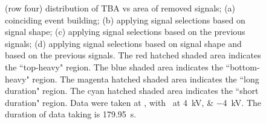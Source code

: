 \begin{landscape}
\begin{figure}[!p]
{			(row four) distribution of TBA vs area of removed signals;
			(a) coinciding event building; 
			(b) applying signal selections based on signal shape;
			(c) applying signal selections based on the previous signals;
			(d) applying signal selections based on signal shape and based on the previous signals.
			The red hatched shaded area indicates the ``top-heavy" region.
			The blue shaded area indicates the ``bottom-heavy" region.
			The magenta hatched shaded area indicates the ``long duration" region.
			The cyan hatched shaded area indicates the ``short duration" region.
			Data were taken at , with \opvtvb\ at \SIlist{+4;-4}{kV}. The duration of data taking is \SI{179.95}{\s}.
		}
		\label{fig:signal selection dv 08}
	\end{figure}
\end{landscape}
